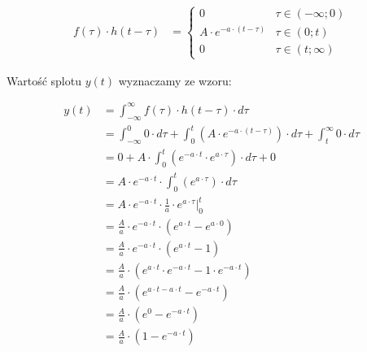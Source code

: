 \begin{task}
\begin{figure}[H]
\begin{animateinline}[controls,autoplay,loop,poster = 10]{10}
{  
		}
	\end{animateinline}
\end{figure}


\begin{align*}
f(\tau) \cdot h(t-\tau)&=\begin{cases}
0 & \tau \in \left(-\infty; 0\right)\\
A \cdot e^{-a \cdot (t-\tau)} & \tau \in \left(0; t\right)\\
0 & \tau \in \left( t; \infty \right)
\end{cases}
\end{align*}

Wartość splotu $y(t)$ wyznaczamy ze wzoru:

\begin{align*}
y(t)&=\int_{-\infty}^{\infty} f(\tau) \cdot h(t-\tau) \cdot d\tau\\
&=\int_{-\infty}^{0} 0 \cdot d\tau + \int_{0}^{t}\left(A \cdot e^{-a \cdot (t-\tau)}\right)\cdot d\tau +\int_{t}^{\infty} 0 \cdot d\tau\\
&=0 + A \cdot \int_{0}^{t}\left(e^{-a \cdot t}\cdot e^{a \cdot \tau}\right)\cdot d\tau +0\\
&=A \cdot e^{-a \cdot t} \cdot \int_{0}^{t}\left(e^{a \cdot \tau}\right)\cdot d\tau\\
&=A \cdot e^{-a \cdot t} \cdot \frac{1}{a} \cdot \left.e^{a \cdot \tau}\right|_{0}^{t}\\
&=\frac{A}{a} \cdot e^{-a \cdot t} \cdot \left(e^{a \cdot t} - e^{a \cdot 0} \right)\\
&=\frac{A}{a} \cdot e^{-a \cdot t} \cdot \left(e^{a \cdot t} - 1 \right)\\
&=\frac{A}{a} \cdot \left(e^{a \cdot t} \cdot e^{-a \cdot t} - 1 \cdot e^{-a \cdot t}\right)\\
&=\frac{A}{a} \cdot \left(e^{a \cdot t -a \cdot t} - e^{-a \cdot t}\right)\\
&=\frac{A}{a} \cdot \left(e^{0} - e^{-a \cdot t}\right)\\
&=\frac{A}{a} \cdot \left(1 - e^{-a \cdot t}\right)\\
\end{align*}


\end{task}
